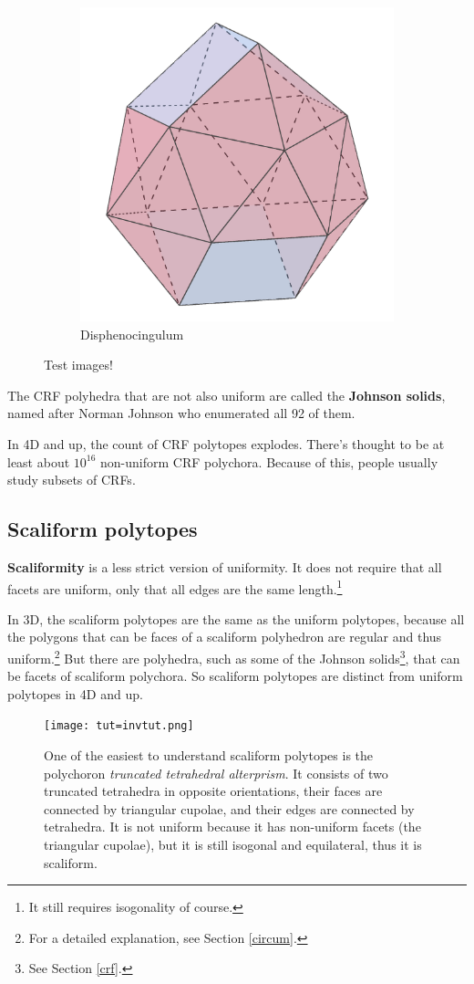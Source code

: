 \documentclass{article}
\begin{document}
\begin{figure}[h]
  \begin{subfigure}{.33333\textwidth}
    \centering
    \includegraphics[width=.5\linewidth]{Disphenocingulum}
    \caption{Disphenocingulum}
    \label{fig:polyhedra_3}
  \end{subfigure}%
  \caption{Test images!}
  \label{fig:crf_polyhedra}
\end{figure}

The CRF polyhedra that are not also uniform are called the \textbf{Johnson solids}, named after
Norman Johnson who enumerated all 92 of them.

In 4D and up, the count of CRF polytopes explodes. There's thought to be at least about $10^{16}$
non-uniform CRF polychora. Because of this, people usually study subsets of CRFs.

\subsection{Scaliform polytopes}
\label{scaliform}

\textbf{Scaliformity} is a less strict version of uniformity. It does not require that
all facets are uniform, only that all edges are the same length.\footnote{
  It still requires isogonality of course.}

In 3D, the scaliform polytopes are the same as the uniform polytopes, because all the polygons
that can be faces of a scaliform polyhedron are regular and thus uniform.\footnote{
  For a detailed explanation, see Section \ref{circum}.} But there are
polyhedra, such as some of the Johnson solids\footnote{See Section \ref{crf}.}, that can be facets
of scaliform polychora. So scaliform polytopes are distinct from uniform polytopes in 4D and up.

\begin{figure}[H]
  \centering
  \texttt{[image: tut=invtut.png]}
  \caption{One of the easiest to understand scaliform polytopes is the polychoron
    \textit{truncated tetrahedral alterprism}. It consists of two truncated tetrahedra
    in opposite orientations, their faces are connected by triangular cupolae, and
    their edges are connected by tetrahedra. It is not uniform because it has non-uniform
    facets (the triangular cupolae), but it is still isogonal and equilateral, thus it is
    scaliform.}
\end{figure}
\end{document}
